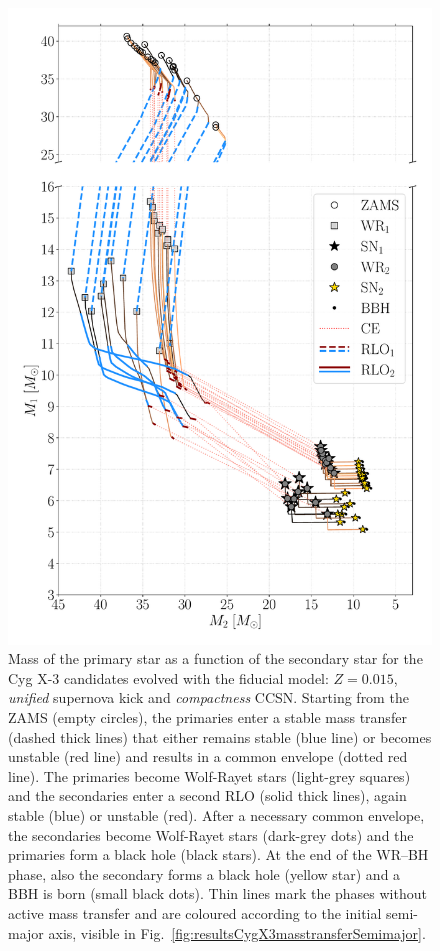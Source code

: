 \documentclass[a4paper,titlepage]{book}     	%
\begin{document}
\begin{figure}[h!]
	\centering
	\includegraphics[width=.9\textwidth]{./images/com_Mass_1_Mass_0_BHBH_GW_WRBH_cyg_x-3--Ko17.pdf}
	\caption{Mass of the primary star as a function of the secondary star for the Cyg X-3 candidates evolved with the fiducial model: $Z=0.015$, \emph{unified} supernova kick and \emph{compactness} CCSN. Starting from the ZAMS (empty circles), the primaries enter a stable mass transfer (dashed thick lines) that either remains stable (blue line) or becomes unstable (red line) and results in a common envelope (dotted red line). The primaries become Wolf-Rayet stars (light-grey squares) and the secondaries enter a second RLO (solid thick lines), again stable (blue) or unstable (red). After a necessary common envelope, the secondaries become Wolf-Rayet stars (dark-grey dots) and the primaries form a black hole (black stars). At the end of the WR--BH phase, also the secondary forms a black hole (yellow star) and a BBH is born (small black dots). Thin lines mark the phases without active mass transfer and are coloured according to the initial semi-major axis, visible in Fig.\ \ref{fig:resultsCygX3masstransferSemimajor}.}\label{fig:resultsCygX3masstransferM1M2}
\end{figure}
\end{document}

